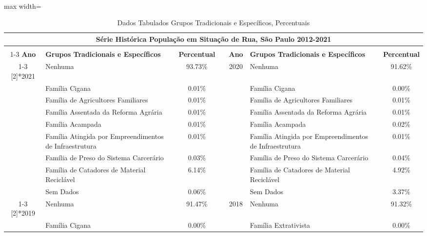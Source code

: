 \documentclass[14pt]{extarticle}
\begin{document}
\begin{table}[htbp]
  \centering
  \caption{Dados Tabulados Grupos Tradicionais e Específicos, Percentuais}
  \tabcolsep=0.20cm
	\renewcommand{\arraystretch}{1.5}
	\begin{adjustbox}{max width=\linewidth}
    \begin{tabular}{clcrclc}
    \toprule
    \multicolumn{7}{c}{Série Histórica População em Situação de Rua, São Paulo 2012-2021} \\
    \midrule
         &      &      &      &      &      &  \\
\cmidrule{1-3}\cmidrule{5-7}    \rowcolor[rgb]{ .906,  .902,  .902} \textbf{Ano} & \textbf{Grupos Tradicionais e Específicos} & \textbf{Percentual} & \cellcolor[rgb]{ 1,  1,  1} & \textbf{Ano} & \textbf{Grupos Tradicionais e Específicos} & \textbf{Percentual} \\
\cmidrule{1-3}\cmidrule{5-7}    \multirow{9}[2]{*}{2021} & Nenhuma & 93.73\% &      & \multirow{9}[2]{*}{2020} & Nenhuma & 91.62\% \\
         & Família Cigana & 0.01\% &      &      & Família Cigana & 0.00\% \\
         & Família de Agricultores Familiares & 0.01\% &      &      & Família de Agricultores Familiares & 0.01\% \\
         & Família Assentada da Reforma Agrária & 0.01\% &      &      & Família Assentada da Reforma Agrária & 0.01\% \\
         & Família Acampada & 0.01\% &      &      & Família Acampada & 0.02\% \\
         & Família Atingida por Empreendimentos de Infraestrutura & 0.01\% &      &      & Família Atingida por Empreendimentos de Infraestrutura & 0.01\% \\
         & Família de Preso do Sistema Carcerário & 0.03\% &      &      & Família de Preso do Sistema Carcerário & 0.04\% \\
         & Família de Catadores de Material Reciclável & 6.14\% &      &      & Família de Catadores de Material Reciclável & 4.92\% \\
         & Sem Dados & 0.06\% &      &      & Sem Dados & 3.37\% \\
\cmidrule{1-3}\cmidrule{5-7}    \multirow{9}[2]{*}{2019} & Nenhuma & 91.47\% &      & \multirow{9}[2]{*}{2018} & Nenhuma & 91.32\% \\
         & Família Cigana & 0.00\% &      &      & Família Extrativista & 0.00\% \\

\end{tabular}
\end{adjustbox}
\end{table}
\end{document}
